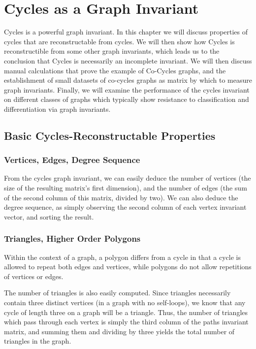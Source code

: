 \documentclass[11pt,a4paper]{report}
\begin{document}
\chapter{Cycles as a Graph Invariant}
Cycles is a powerful graph invariant.
In this chapter we will discuss properties of cycles that are reconstructable from cycles.
We will then show how Cycles is reconstructible from some other graph invariants, which leads us to the conclusion that Cycles is necessarily an incomplete invariant.
We will then discuss manual calculations that prove the example of Co-Cycles graphs, and the establishment of small datasets of co-cycles graphs as matrix by which to measure graph invariants.
Finally, we will examine the performance of the cycles invariant on different classes of graphs which typically show resistance to classification and differentiation via graph invariants.

\section{Basic Cycles-Reconstructable Properties}

\subsection{Vertices, Edges, Degree Sequence}
From the cycles graph invariant, we can easily deduce the number of vertices (the size of the resulting matrix's first dimension), and the number of edges (the sum of the second column of this matrix, divided by two).
We can also deduce the degree sequence, as simply observing the second column of each vertex invariant vector, and sorting the result.

\subsection{Triangles, Higher Order Polygons}
Within the context of a graph, a polygon differs from a cycle in that a cycle is allowed to repeat both edges and vertices, while polygons do not allow repetitions of vertices or edges.

The number of triangles is also easily computed.  Since triangles necessarily contain three distinct vertices (in a graph with no self-loops), we know that any cycle of length three on a graph will be a triangle.
Thus, the number of triangles which pass through each vertex is simply the third column of the paths invariant matrix, and summing them and dividing by three yields the total number of triangles in the graph.
\end{document}
